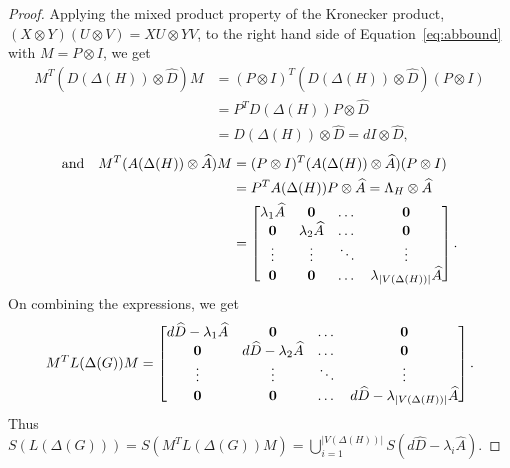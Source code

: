 \documentclass[10pt,a4paper]{amsart}
\def \la {{\lambda}}
\begin{document}
\begin{proof}
        Applying the mixed product property of the Kronecker product, 
        $(X\otimes Y)(U\otimes V) = XU\otimes YV$, to the right hand side 
        of Equation~\eqref{eq:abbound} with $M = P\otimes I$, we get
    \begin{align*}
        M^T(D(\Delta(H))\otimes \widehat D)M&=(P\otimes I)^T(D(\Delta(H))\otimes \widehat D)(P\otimes I)\\
        &=P^TD(\Delta(H))P\otimes \widehat D\\
        &=D(\Delta(H))\otimes \widehat D=d I\otimes \widehat D,
    \end{align*}
    \begin{align*}
      \text{and}\quad  M^T(A(\Delta(H))\otimes \widehat A)M&=(P\otimes I)^T(A(\Delta(H))\otimes \widehat A)(P\otimes I)\\
        &=P^TA(\Delta(H))P\otimes \widehat A=\Lambda_H\otimes \widehat A\\
        &=\begin{bmatrix}
            \la_1\widehat A&\bf 0&\dots &\bf 0\\
            \bf 0&\la_2\widehat A&\dots &\bf 0\\
            \vdots&\vdots&\ddots&\vdots\\
        \bf 0&\bf 0&\dots&\la_{|V(\Delta(H))|}\widehat A
        \end{bmatrix}.
    \end{align*}
    On combining the expressions, we get
    $$M^TL(\Delta(G)) M=\begin{bmatrix}
        d\widehat D-\la_1\widehat A&\bf 0&\dots &\bf 0\\
    \bf 0&d\widehat D-\la_2\widehat A&\dots &\bf 0\\
    \vdots&\vdots&\ddots&\vdots\\
    \bf 0&\bf 0&\dots&d\widehat D-\la_{|V(\Delta(H))|}\widehat A \end{bmatrix}.$$
    Thus $S(L(\Delta(G)))=S(M^TL(\Delta(G))M)=\bigcup\limits_{i=1}^{|V(\Delta(H))|}S(d \widehat D-\la_i\widehat A).$
    \end{proof}
\end{document}
